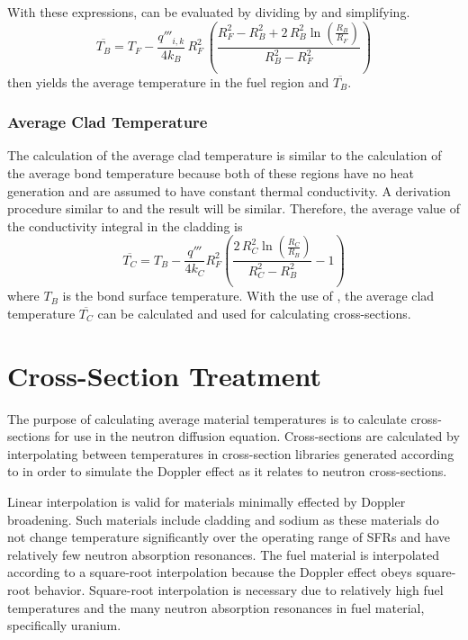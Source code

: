       With these expressions,  can be evaluated by 
      dividing  by  and 
      simplifying.
      \begin{equation}
        \label{eq:tb_bar}
        \overline{T_B} = T_F - \frac{q'''_{i,k}}{4 k_B} \, R_F^2 \, \left(
          \frac{R_F^2 - R_B^2 + 2\,R_B^2 \ln\left(\frac{R_B}{R_F}\right)}
          {R_B^2-R_F^2}\right)
      \end{equation}
       then yields the average temperature in the fuel region
      and $\overline{T_B}$.

    \subsubsection{Average Clad Temperature}
      The calculation of the average clad temperature is similar to the
      calculation of the average bond temperature because both of these regions
      have no heat generation and are assumed to have constant thermal
      conductivity. A derivation procedure similar to
       and the result will be similar. Therefore,
      the average value of the conductivity integral in the cladding is 
      \begin{equation}
        \label{eq:tc_bar}
        \overline{T_C} = T_B - \frac{q'''}{4 k_C} R_F^2 \left(
          \frac{2 \, R_C^2 \ln\left(\frac{R_C}{R_B}\right)}
          {R_C^2 - R_B^2}  - 1\right)
      \end{equation}
      where $T_B$ is the bond surface temperature. With the use of
      , the average clad temperature $\overline{T_C}$ can be
      calculated and used for calculating cross-sections.

\section{Cross-Section Treatment}
  The purpose of calculating average material temperatures is to calculate
  cross-sections for use in the neutron diffusion equation. Cross-sections are
  calculated by interpolating between temperatures in cross-section libraries
  generated according to  in order to simulate
  the Doppler effect as it relates to neutron cross-sections.

  Linear interpolation is valid for materials minimally effected by Doppler 
  broadening. Such materials include cladding and sodium as these materials do 
  not change temperature significantly over the operating range of SFRs
  and have relatively few neutron absorption resonances. The fuel material is 
  interpolated according to a square-root interpolation because the Doppler 
  effect obeys square-root behavior. Square-root interpolation is necessary
  due to relatively high fuel temperatures and the many neutron absorption 
  resonances in fuel material, specifically uranium.

